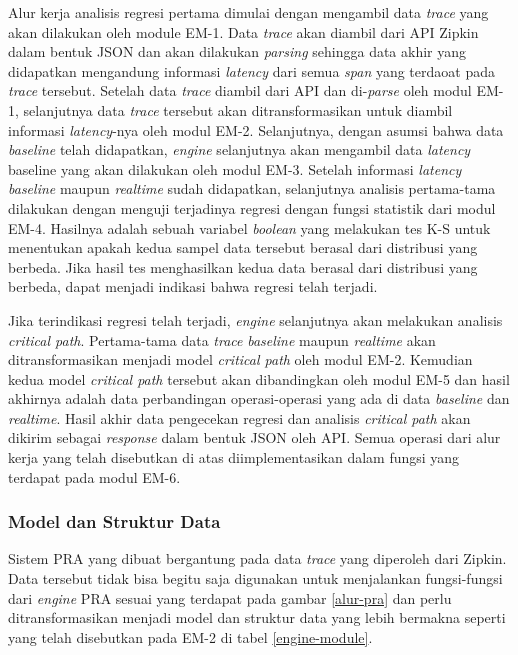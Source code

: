 Alur kerja analisis regresi pertama dimulai dengan mengambil data \textit{trace} yang akan dilakukan oleh module EM-1. Data \textit{trace} akan diambil dari API Zipkin dalam bentuk JSON dan akan dilakukan \textit{parsing} sehingga data akhir yang didapatkan mengandung informasi \textit{latency} dari semua \textit{span} yang terdaoat pada \textit{trace} tersebut. Setelah data \textit{trace} diambil dari API dan di-\textit{parse} oleh modul EM-1, selanjutnya data \textit{trace} tersebut akan ditransformasikan untuk diambil informasi \textit{latency}-nya oleh modul EM-2. Selanjutnya, dengan asumsi bahwa data \textit{baseline} telah didapatkan, \textit{engine} selanjutnya akan mengambil data \textit{latency} baseline yang akan dilakukan oleh modul EM-3. Setelah informasi \textit{latency} \textit{baseline} maupun \textit{realtime} sudah didapatkan, selanjutnya analisis pertama-tama dilakukan dengan menguji terjadinya regresi dengan fungsi statistik dari modul EM-4. Hasilnya adalah sebuah variabel \textit{boolean} yang melakukan tes K-S untuk menentukan apakah kedua sampel data tersebut berasal dari distribusi yang berbeda. Jika hasil tes menghasilkan kedua data berasal dari distribusi yang berbeda, dapat menjadi indikasi bahwa regresi telah terjadi. 

Jika terindikasi regresi telah terjadi, \textit{engine} selanjutnya akan melakukan analisis \textit{critical path}. Pertama-tama data \textit{trace} \textit{baseline} maupun \textit{realtime} akan ditransformasikan menjadi model \textit{critical path} oleh modul EM-2. Kemudian kedua model \textit{critical path} tersebut akan dibandingkan oleh modul EM-5 dan hasil akhirnya adalah data perbandingan operasi-operasi yang ada di data \textit{baseline} dan \textit{realtime}. Hasil akhir data pengecekan regresi dan analisis \textit{critical path} akan dikirim sebagai \textit{response} dalam bentuk JSON oleh API. Semua operasi dari alur kerja yang telah disebutkan di atas diimplementasikan dalam fungsi yang terdapat pada modul EM-6.

\subsubsection{Model dan Struktur Data}
Sistem PRA yang dibuat bergantung pada data \textit{trace} yang diperoleh dari Zipkin. Data tersebut tidak bisa begitu saja digunakan untuk menjalankan fungsi-fungsi dari \textit{engine} PRA sesuai yang terdapat pada gambar \ref{alur-pra} dan perlu ditransformasikan menjadi model dan struktur data yang lebih bermakna seperti yang telah disebutkan pada EM-2 di tabel \ref{engine-module}.

